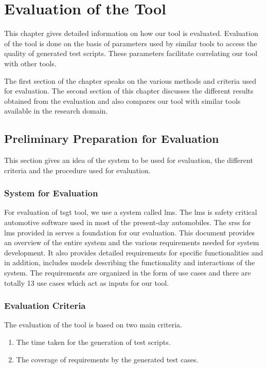 
\chapter{Evaluation of the Tool}\label{evaluation} 
This chapter gives detailed information on how our tool is evaluated. Evaluation of the tool is done on the basis of parameters used by similar tools to access the quality of generated test scripts. These parameters facilitate correlating our tool with other tools.

The first section of the chapter speaks on the various methods and criteria used for evaluation. The second section of this chapter discusses the different results obtained from the evaluation and also compares our tool with similar tools available in the research domain.
\section{Preliminary Preparation for Evaluation}
This section gives an idea of the system to be used for evaluation, the different criteria and the procedure used for evaluation.
\subsection{System for Evaluation}
For evaluation of \gls{tsgt} tool, we use a system called \gls{lms}. The \gls{lms} is safety critical automotive software used in most of the present-day automobiles. The \glspl{srs} for \gls{lms} provided in \cite{blazysoftware} serves a foundation for our evaluation. This document provides an overview of the entire system and the various requirements needed for system development.  It also provides detailed requirements for specific functionalities and in addition, includes models describing the functionality and interactions of the system. The requirements are organized in the form of use cases and there are totally 13 use cases which act as inputs for our tool.
\subsection{Evaluation Criteria}\label{criteria}
The evaluation of the tool is based on two main criteria.
\begin{enumerate}
\item The time taken for the generation of test scripts.
\item The coverage of requirements by the generated test cases.
\end{enumerate}

